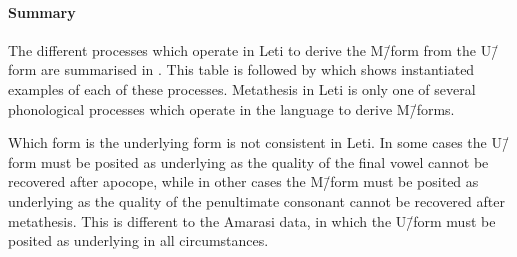 \begin{exe}
	\label{LetApo-3}
\end{exe}

\paragraph{Summary}\label{sec:LetSum}
The different processes which operate in Leti to derive the M\=/form from the U\=/form
are summarised in .
This table is followed by 
which shows instantiated examples of each of these processes.
Metathesis in Leti is only one of several
phonological processes which operate in the language to derive M\=/forms.

Which form is the underlying form is not consistent in Leti.
In some cases the U\=/form must be posited as underlying as
the quality of the final vowel cannot be recovered after apocope,
while in other cases the M\=/form must be posited as underlying as the quality
of the penultimate consonant cannot be recovered after metathesis.
This is different to the Amarasi data, in which the U\=/form
must be posited as underlying in all circumstances.

\newcommand{\CV}{{\{}$\frac{\textrm{C}}{\textrm{V}}${\}}}
\newcommand{\cbl}{\cellcolor{blue!40}}
\newcommand{\ccy}{\cellcolor{green!50}}
\newcommand{\cye}{\cellcolor{yellow!75}}

